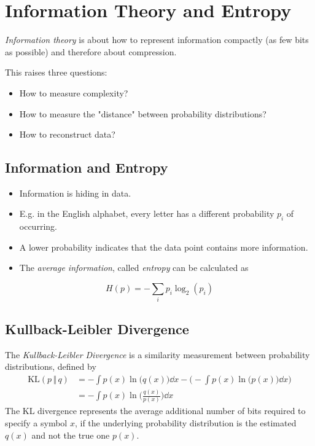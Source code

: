 	\section{Information Theory and Entropy}
		\emph{Information theory} is about how to represent information compactly (as few bits as possible) and therefore about compression.

		This raises three questions:
		\begin{itemize}
			\item How to measure complexity?
			\item How to measure the "distance" between probability distributions?
			\item How to reconstruct data?
		\end{itemize}

		\subsection{Information and Entropy}
			\begin{itemize}
				\item Information is hiding in data.
				\item E.g. in the English alphabet, every letter has a different probability \(p_i\) of occurring.
				\item A lower probability indicates that the data point contains more information.
				\item The \emph{average information}, called \emph{entropy} can be calculated as
			\end{itemize}
			\begin{equation}
				H(p) = -\sum_{i} p_i \log_2(p_i)
			\end{equation}

		\subsection{Kullback-Leibler Divergence}
			The \emph{Kullback-Leibler Divergence} is a similarity measurement between probability distributions, defined by
			\begin{align}
				\textrm{KL}(p \,\Vert\, q) & = -\int p(x) \ln\big(q(x)\big) \dd{x} - \Bigg( -\int p(x) \ln\big(p(x)\big) \dd{x} \Bigg) \\
				                           & = -\int p(x) \ln\bigg(\frac{q(x)}{p(x)}\bigg) \dd{x}
			\end{align}
			The KL divergence represents the average additional number of bits required to specify a symbol \(x\), if the underlying probability distribution is the estimated \(q(x)\) and not the true one \(p(x)\).

